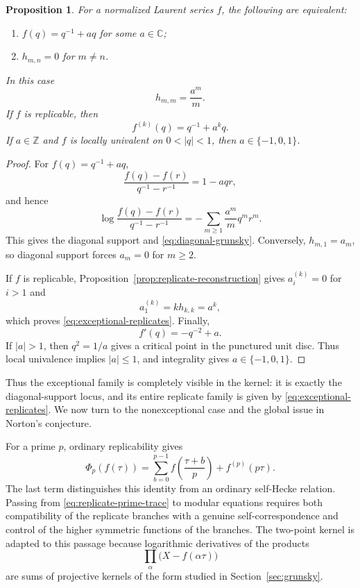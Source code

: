 \documentclass[11pt]{amsart}
\newtheorem{prop}[thm]{Proposition}
\theoremstyle{definition}
\theoremstyle{remark}
\numberwithin{equation}{section}
\begin{document}
\begin{prop}\label{prop:norton-diagonal-kernel}
For a normalized Laurent series $f$, the following are equivalent:
\begin{enumerate}
\item $f(q)=q^{-1}+aq$ for some $a\in\mathbb C$;
\item $h_{m,n}=0$ for $m\neq n$.
\end{enumerate}
In this case
\begin{equation}\label{eq:diagonal-grunsky}
h_{m,m}=\frac{a^m}{m}.
\end{equation}
If $f$ is replicable, then
\begin{equation}\label{eq:exceptional-replicates}
f^{(k)}(q)=q^{-1}+a^kq.
\end{equation}
If $a\in\mathbb Z$ and $f$ is locally univalent on $0<|q|<1$, then $a\in\{-1,0,1\}$.
\end{prop}

\begin{proof}
For $f(q)=q^{-1}+aq$,
\[
\frac{f(q)-f(r)}{q^{-1}-r^{-1}}=1-aqr,
\]
and hence
\[
\log\frac{f(q)-f(r)}{q^{-1}-r^{-1}}
=-\sum_{m\geq1}\frac{a^m}{m}q^mr^m.
\]
This gives the diagonal support and \eqref{eq:diagonal-grunsky}. Conversely, $h_{m,1}=a_m$, so diagonal support forces $a_m=0$ for $m\geq2$.

If $f$ is replicable, Proposition~\ref{prop:replicate-reconstruction} gives $a_i^{(k)}=0$ for $i>1$ and
\[
a_1^{(k)}=kh_{k,k}=a^k,
\]
which proves \eqref{eq:exceptional-replicates}. Finally,
\[
f'(q)=-q^{-2}+a.
\]
If $|a|>1$, then $q^2=1/a$ gives a critical point in the punctured unit disc. Thus local univalence implies $|a|\leq1$, and integrality gives $a\in\{-1,0,1\}$.
\end{proof}

Thus the exceptional family is completely visible in the kernel: it is exactly the diagonal-support locus, and its entire replicate family is given by \eqref{eq:exceptional-replicates}. We now turn to the nonexceptional case and the global issue in Norton's conjecture.

For a prime $p$, ordinary replicability gives
\begin{equation}\label{eq:replicate-prime-trace}
\Phi_p(f(\tau))
=
\sum_{b=0}^{p-1}
f\!\left(\frac{\tau+b}{p}\right)
+
f^{(p)}(p\tau).
\end{equation}
The last term distinguishes this identity from an ordinary self-Hecke relation. Passing from \eqref{eq:replicate-prime-trace} to modular equations requires both compatibility of the replicate branches with a genuine self-correspondence and control of the higher symmetric functions of the branches. The two-point kernel is adapted to this passage because logarithmic derivatives of the products
\[
\prod_\alpha\bigl(X-f(\alpha\tau)\bigr)
\]
are sums of projective kernels of the form studied in Section~\ref{sec:grunsky}.
\end{document}
